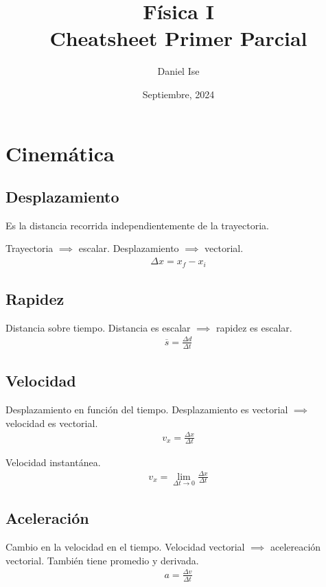 \documentclass[12pt]{article}
\title{Física I\\Cheatsheet Primer Parcial}
\author{Daniel Ise}
\date{Septiembre, 2024}
\begin{document}
\maketitle

\tableofcontents

\pagebreak

\section{Cinemática}

\subsection{Desplazamiento}

Es la distancia recorrida independientemente de la trayectoria.

Trayectoria \(\implies\) escalar.
Desplazamiento \(\implies\) vectorial.
\begin{align*}
    \Delta x = x_{f} - x_{i}
\end{align*}

\subsection{Rapidez}

Distancia sobre tiempo. Distancia es escalar \(\implies\) rapidez es escalar.
\begin{align*}
    \overline{s} = \frac{\Delta d}{\Delta t}
\end{align*}

\subsection{Velocidad}

Desplazamiento en función del tiempo. Desplazamiento es vectorial \(\implies\) velocidad es vectorial.
\begin{align*}
    v_{x} = \frac{\Delta x}{\Delta t}
\end{align*}

Velocidad instantánea.
\begin{align*}
    v_{x} = \lim_{\Delta t \to 0} \frac{\Delta x}{\Delta t}
\end{align*}

\subsection{Aceleración}

Cambio en la velocidad en el tiempo. Velocidad vectorial \(\implies\) acelereación vectorial.
También tiene promedio y derivada.
\begin{align*}
    a = \frac{\Delta v}{\Delta t}
\end{align*}
\end{document}
